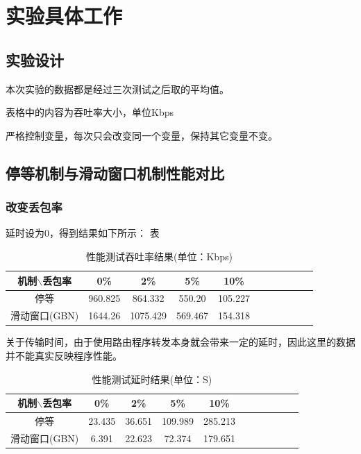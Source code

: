 \documentclass[UTF8,a4paper,10pt]{ctexart}
\begin{document}
\section{实验具体工作}
\subsection{实验设计}
本次实验的数据都是经过三次测试之后取的平均值。\par
表格中的内容为吞吐率大小，单位Kbps\par
严格控制变量，每次只会改变同一个变量，保持其它变量不变。
\subsection{停等机制与滑动窗口机制性能对比}
\subsubsection{改变丢包率}
延时设为0，得到结果如下所示：
表
\begin{table}[!htbp]
  \centering
  \begin{tabular}{ccccccccccc}
  \toprule  
  机制$\backslash$丢包率& 0\%& 2\%& 5\%& 10\%\\
  \midrule
  停等& 960.825& 864.332& 550.20& 105.227\\
  滑动窗口(GBN)& 1644.26& 1075.429& 569.467& 154.318\\
  \bottomrule
  \end{tabular}
  \caption{性能测试吞吐率结果(单位：Kbps)}
\end{table}

关于传输时间，由于使用路由程序转发本身就会带来一定的延时，因此这里的数据并不能真实反映程序性能。
\begin{table}[!htbp]
  \centering
  \begin{tabular}{ccccccccccc}
  \toprule  
  机制$\backslash$丢包率& 0\%& 2\%& 5\%& 10\%\\
  \midrule
  停等& 23.435& 36.651& 109.989& 285.213\\
  滑动窗口(GBN)& 6.391& 22.623& 72.374& 179.651\\
  \bottomrule
  \end{tabular}
  \caption{性能测试延时结果(单位：S)}
\end{table}
\end{document}
